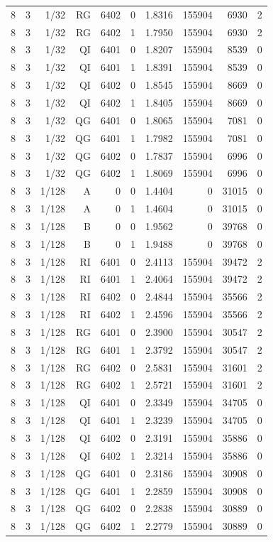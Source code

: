 \begin{longtable}{lrrrrrrrrr}
8 & 3 & 1/32 & RG & 6402 & 0 & 1.8316 & 155904 & 6930 & 2 \\
8 & 3 & 1/32 & RG & 6402 & 1 & 1.7950 & 155904 & 6930 & 2 \\
8 & 3 & 1/32 & QI & 6401 & 0 & 1.8207 & 155904 & 8539 & 0 \\
8 & 3 & 1/32 & QI & 6401 & 1 & 1.8391 & 155904 & 8539 & 0 \\
8 & 3 & 1/32 & QI & 6402 & 0 & 1.8545 & 155904 & 8669 & 0 \\
8 & 3 & 1/32 & QI & 6402 & 1 & 1.8405 & 155904 & 8669 & 0 \\
8 & 3 & 1/32 & QG & 6401 & 0 & 1.8065 & 155904 & 7081 & 0 \\
8 & 3 & 1/32 & QG & 6401 & 1 & 1.7982 & 155904 & 7081 & 0 \\
8 & 3 & 1/32 & QG & 6402 & 0 & 1.7837 & 155904 & 6996 & 0 \\
8 & 3 & 1/32 & QG & 6402 & 1 & 1.8069 & 155904 & 6996 & 0 \\
8 & 3 & 1/128 & A & 0 & 0 & 1.4404 & 0 & 31015 & 0 \\
8 & 3 & 1/128 & A & 0 & 1 & 1.4604 & 0 & 31015 & 0 \\
8 & 3 & 1/128 & B & 0 & 0 & 1.9562 & 0 & 39768 & 0 \\
8 & 3 & 1/128 & B & 0 & 1 & 1.9488 & 0 & 39768 & 0 \\
8 & 3 & 1/128 & RI & 6401 & 0 & 2.4113 & 155904 & 39472 & 2 \\
8 & 3 & 1/128 & RI & 6401 & 1 & 2.4064 & 155904 & 39472 & 2 \\
8 & 3 & 1/128 & RI & 6402 & 0 & 2.4844 & 155904 & 35566 & 2 \\
8 & 3 & 1/128 & RI & 6402 & 1 & 2.4596 & 155904 & 35566 & 2 \\
8 & 3 & 1/128 & RG & 6401 & 0 & 2.3900 & 155904 & 30547 & 2 \\
8 & 3 & 1/128 & RG & 6401 & 1 & 2.3792 & 155904 & 30547 & 2 \\
8 & 3 & 1/128 & RG & 6402 & 0 & 2.5831 & 155904 & 31601 & 2 \\
8 & 3 & 1/128 & RG & 6402 & 1 & 2.5721 & 155904 & 31601 & 2 \\
8 & 3 & 1/128 & QI & 6401 & 0 & 2.3349 & 155904 & 34705 & 0 \\
8 & 3 & 1/128 & QI & 6401 & 1 & 2.3239 & 155904 & 34705 & 0 \\
8 & 3 & 1/128 & QI & 6402 & 0 & 2.3191 & 155904 & 35886 & 0 \\
8 & 3 & 1/128 & QI & 6402 & 1 & 2.3214 & 155904 & 35886 & 0 \\
8 & 3 & 1/128 & QG & 6401 & 0 & 2.3186 & 155904 & 30908 & 0 \\
8 & 3 & 1/128 & QG & 6401 & 1 & 2.2859 & 155904 & 30908 & 0 \\
8 & 3 & 1/128 & QG & 6402 & 0 & 2.2838 & 155904 & 30889 & 0 \\
8 & 3 & 1/128 & QG & 6402 & 1 & 2.2779 & 155904 & 30889 & 0 \\
\end{longtable}
\endgroup
